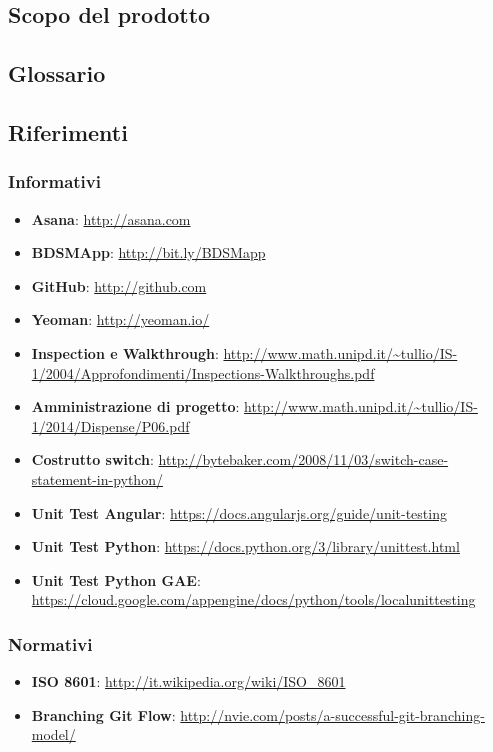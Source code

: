 	\subsection{Scopo del prodotto}
		\productScope

	\subsection{Glossario}
		\glossarioDesc

	\subsection{Riferimenti}
		\subsubsection{Informativi}
		\begin{itemize}
			\item \textbf{Asana}: \url{http://asana.com}
			\item \textbf{BDSMApp}: \url{http://bit.ly/BDSMapp}
			\item \textbf{GitHub}: \url{http://github.com}
			\item \textbf{Yeoman}: \url{http://yeoman.io/}
			\item \textbf{Inspection e Walkthrough}: \url{http://www.math.unipd.it/~tullio/IS-1/2004/Approfondimenti/Inspections-Walkthroughs.pdf}
			\item \textbf{Amministrazione di progetto}: \url{http://www.math.unipd.it/~tullio/IS-1/2014/Dispense/P06.pdf}
			\item \textbf{Costrutto switch}: \url{http://bytebaker.com/2008/11/03/switch-case-statement-in-python/}
			\item \textbf{Unit Test Angular}: \url{https://docs.angularjs.org/guide/unit-testing}
			\item \textbf{Unit Test Python}: \url{https://docs.python.org/3/library/unittest.html}
			\item \textbf{Unit Test Python GAE}: \url{https://cloud.google.com/appengine/docs/python/tools/localunittesting}
		\end{itemize}

		\subsubsection{Normativi}
		\begin{itemize}
			\item \textbf{ISO 8601}: \url{http://it.wikipedia.org/wiki/ISO_8601}
			\item \textbf{Branching Git Flow}: \url{http://nvie.com/posts/a-successful-git-branching-model/}
		\end{itemize}
